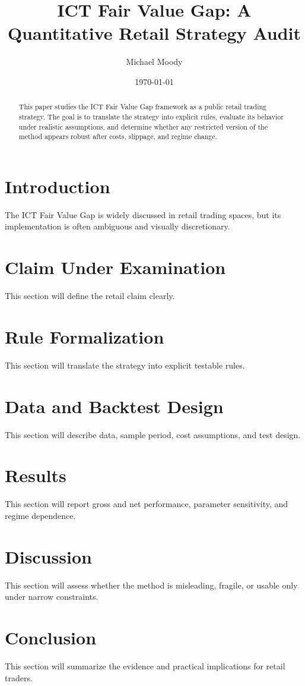 \documentclass[11pt]{article}
\title{\textbf{ICT Fair Value Gap: A Quantitative Retail Strategy Audit}}
\author{Michael Moody}
\date{\today}
\begin{document}
\maketitle

\begin{abstract}
This paper studies the ICT Fair Value Gap framework as a public retail trading strategy. The goal is to translate the strategy into explicit rules, evaluate its behavior under realistic assumptions, and determine whether any restricted version of the method appears robust after costs, slippage, and regime change.
\end{abstract}

\section{Introduction}
The ICT Fair Value Gap is widely discussed in retail trading spaces, but its implementation is often ambiguous and visually discretionary.

\section{Claim Under Examination}
This section will define the retail claim clearly.

\section{Rule Formalization}
This section will translate the strategy into explicit testable rules.

\section{Data and Backtest Design}
This section will describe data, sample period, cost assumptions, and test design.

\section{Results}
This section will report gross and net performance, parameter sensitivity, and regime dependence.

\section{Discussion}
This section will assess whether the method is misleading, fragile, or usable only under narrow constraints.

\section{Conclusion}
This section will summarize the evidence and practical implications for retail traders.
\end{document}
